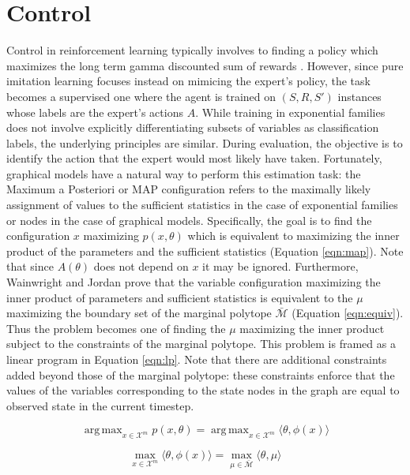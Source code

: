 \documentclass{article} %
\DeclareMathOperator*{\argmax}{arg\,max}
\begin{document}
\section{Control}

Control in reinforcement learning typically involves to finding a policy which maximizes the long term gamma discounted sum of rewards \cite{sutton98}. However, since pure imitation learning focuses instead on mimicing the expert's policy, the task becomes a supervised one where the agent is trained on $(S,R,S')$ instances whose labels are the expert's actions $A$. While training in exponential families does not involve explicitly differentiating subsets of variables as classification labels, the underlying principles are similar. During evaluation, the objective is to identify the action that the expert would most likely have taken. Fortunately, graphical models have a natural way to perform this estimation task: the Maximum a Posteriori or MAP configuration refers to the maximally likely assignment of values to the sufficient statistics in the case of exponential families or nodes in the case of graphical models. Specifically, the goal is to find the configuration $x$ maximizing $p(x,\theta)$ which is equivalent to maximizing the inner product of the parameters and the sufficient statistics (Equation \ref{eqn:map}). Note that since $A(\theta)$ does not depend on $x$ it may be ignored. Furthermore, Wainwright and Jordan \cite{wainwright08} prove that the variable configuration maximizing the inner product of parameters and sufficient statistics is equivalent to the $\mu$ maximizing the boundary set of the marginal polytope $\bar{\mathcal{M}}$ (Equation \ref{eqn:equiv}). Thus the problem becomes one of finding the $\mu$ maximizing the inner product subject to the constraints of the marginal polytope. This problem is framed as a linear program in Equation \ref{eqn:lp}. Note that there are additional constraints added beyond those of the marginal polytope: these constraints enforce that the values of the variables corresponding to the state nodes in the graph are equal to observed state in the current timestep.

\begin{equation}
\argmax_{x \in \mathcal{X}^m} p(x,\theta) = \argmax_{x \in \mathcal{X}^m} \langle \theta, \phi(x) \rangle
\label{eqn:map}
\end{equation}

\begin{equation}
\max_{x \in \mathcal{X}^m} \langle \theta,\phi(x) \rangle = \max_{\mu \in \bar{\mathcal{M}}} \langle \theta, \mu \rangle
\label{eqn:equiv}
\end{equation}
\end{document}
